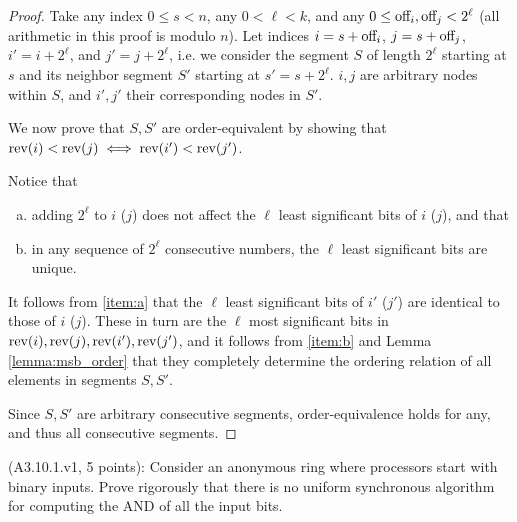 \begin{proof}
Take any index $0 \leq s < n$, any $0 < \ell < k$, and any $0 \leq \text{off}_{i}, \text{off}_{j} < 2^\ell$ (all
arithmetic in this proof is modulo $n$).
Let indices $i = s + \text{off}_{i}$, $j = s + \text{off}_{j}$, $i' = i + 2^\ell$, and $j' = j + 2^\ell$, i.e.
we consider the segment $S$ of length $2^\ell$ starting at $s$ and its neighbor segment $S'$ starting
at $s' = s + 2^\ell$. $i, j$ are arbitrary nodes within $S$, and $i', j'$ their corresponding nodes
in $S'$.

We now prove that $S, S'$ are order-equivalent by showing that
$\text{rev}(i) < \text{rev}(j) \iff \text{rev}(i') < \text{rev}(j')$.

Notice that 

\begin{enumerate}[a)]
\item adding $2^\ell$ to $i$ ($j$) does not affect the $\ell$ least significant
      bits of $i$ ($j$), and that \label{item:a}
\item in any sequence of $2^\ell$ consecutive numbers, the $\ell$ least significant
      bits are unique. \label{item:b}
\end{enumerate}

It follows from \ref{item:a} that the $\ell$ least significant bits of $i'$ ($j'$) are identical to those of
$i$ ($j$). These in turn are the $\ell$ most significant bits in $\text{rev}(i), \text{rev}(j), \text{rev}(i'), \text{rev}(j')$,
and it follows from \ref{item:b} and Lemma \ref{lemma:msb_order} that they 
completely determine the ordering relation of all elements in segments $S, S'$.

Since $S, S'$ are arbitrary consecutive segments, order-equivalence holds for
any, and thus all consecutive segments.
\end{proof}



\begin{Exc}{(A3.10.1.v1, 5 points):}
Consider an anonymous ring where processors start with binary
inputs. Prove rigorously that there is no uniform synchronous
algorithm for computing the AND of all the input bits.
\end{Exc}

